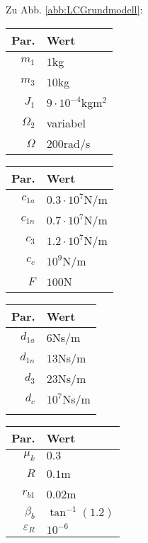 Zu Abb. \ref{abb:LCGrundmodell}:
\begin{center}
\begin{tabular}{r|l}
Par. &Wert\\\hline
$m_1$&$1$kg\\
$m_3$&$10$kg\\
$J_1$&$9\cdot 10^{-4}$kgm$^{2}$\\
$\Omega_2$ & variabel\\
$\Omega$ & $200$rad/s
\end{tabular}\hfill
\begin{tabular}{r|l}
Par. &Wert\\\hline
$c_{1a}$&$0.3\cdot10^{7}$N/m\\
$c_{1n}$&$0.7\cdot10^{7}$N/m \\
$c_{3}$ &$1.2\cdot10^{7}$N/m\\
$c_c$ & $10^{9}$N/m\\
$F$&$100$N
\end{tabular}\hfill
\begin{tabular}{r|l}
Par. &Wert\\\hline
$d_{1a}$&$6$Ns/m\\
$d_{1n}$&$13$Ns/m\\
$d_{3}$&$23$Ns/m\\
$d_{c}$&$10^{7}$Ns/m\\
&
\end{tabular}\hfill
\begin{tabular}{r|l}
Par. &Wert\\\hline
$\mu_k$& $0.3$\\
$R$&$0.1$m \\
$r_{b1}$&$ 0.02$m\\
$\beta_b$&$\tan^{-1}(1.2)$\\
$\varepsilon_R$&$10^{-6}$
\end{tabular}
\end{center}

